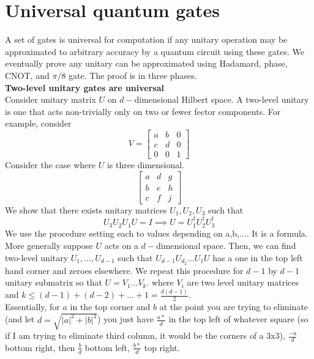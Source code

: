 \documentclass{article}
\begin{document}
\section{Universal quantum gates}
A set of gates is universal for computation if any unitary operation may be approximated to arbitrary accuracy by a quantum circuit using these gates. We eventually prove any unitary can be approximated using Hadamard, phase, CNOT, and $\pi/8$ gate. The proof is in three phases.\\
\textbf{Two-level unitary gates are universal}\\
	Consider unitary matrix $U$ on $d-$dimensional Hilbert space. A two-level unitary is one that acts non-trivially only on two or fewer fector components. For example, consider
	$$V = \begin{bmatrix}  a & b & 0 \\ c & d & 0 \\ 0 & 0 & 1\end{bmatrix}$$
	Consider the case where $U$ is three dimensional.\\
	$$\begin{bmatrix} a & d & g \\ b & e & h \\ c & f & j\end{bmatrix}$$
	We show that there exists unitary matrices $U_1, U_2, U_3$ such that
	$$U_3U_2 U_1 U = I \implies U = U^\dag_1 U_2^\dag U_3^\dag$$
	We use the procedure setting each to values depending on a,b,.... It is a formula.\\
	More generally suppose $U$ acts on a $d-$dimensional space. Then, we can find two-level unitary $U_1, \dots, U_{d-1}$ such that $U_{d-1}U_{d_2}\dots U_1 U$ has a one in the top left hand corner and zeroes elsewhere. We repeat this procedure for $d-1$ by $d-1$ unitary submatrix so that $U = V_1 \dots V_k$. where $V_i$ are two level unitary matrices and $k \leq (d-1) + (d-2) + \dots + 1 = \frac{d(d-1)}{2}$.\\
	Essentially, for $a$ in the top corner and $b$ at the point you are trying to eliminate (and let $d = \sqrt{|a|^2 + |b|^2}$) you just have $\frac{a*}{d}$ in the top left of whatever square (so if I am trying to eliminate third column, it would be the corners of a 3x3), $\frac{-a}{d}$ bottom right, then $\frac{b}{d}$ bottom left, $\frac{b*}{d}$ top right.
\end{document}
